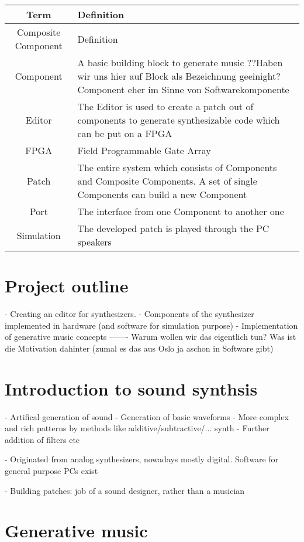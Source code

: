 	 \begin{tabular}[h]{|c|p{9.75cm}|}
	  \hline
	  Term & Definition \\
	  \hline
	  \hline
	  Composite Component & Definition \\\hline
	  Component & A basic building block to generate music ??Haben wir uns hier auf Block als Bezeichnung geeinight? Component eher im Sinne von Softwarekomponente\\\hline
	  Editor & The Editor is used to create a patch out of components to generate synthesizable code which can be put on a FPGA \\\hline
	  FPGA & Field Programmable Gate Array \\\hline
	  Patch & The entire system which consists of Components and Composite Components. A set of single Components can build a new Component \\\hline
	  Port & The interface from one Component to another one \\\hline
	  Simulation & The developed patch is played through the PC speakers \\\hline
	 \end{tabular}
	 
	\section{Project outline}
	  - Creating an editor for synthesizers. 
	  - Components of the synthesizer implemented in hardware (and software for simulation purpose)
	  - Implementation of generative music concepts
	  ------- Warum wollen wir das eigentlich tun? Was ist die Motivation dahinter (zumal es das aus Oslo ja aschon in Software gibt)
	
	\section{Introduction to sound synthsis}
	  - Artifical generation of sound
	  - Generation of basic waveforms
	    - More complex and rich patterns by methods like additive/subtractive/... synth 
	  - Further addition of filters etc
	  
	  - Originated from analog synthesizers, nowadays mostly digital. Software for general purpose PCs exist
	  
	  - Building patches: job of a sound designer, rather than a musician
	  
	\section{Generative music}
	
